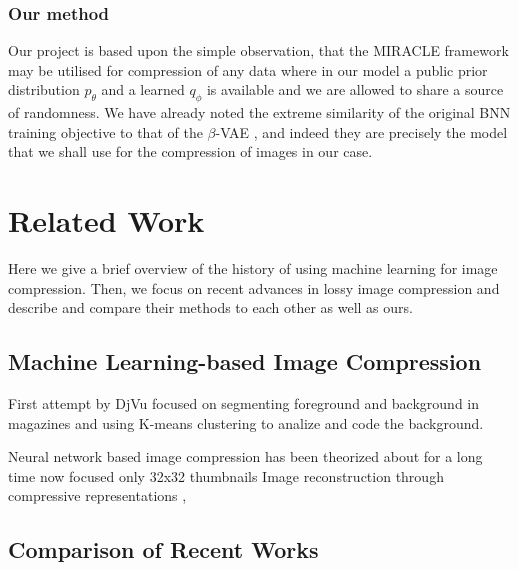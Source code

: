 \documentclass{article}
\begin{document}
\subsubsection{Our method}
Our project is based upon the simple observation, that
the MIRACLE framework may be utilised for compression of any data where in our
model a public prior distribution $p_{\theta}$ and a learned $q_{\phi}$ is
available and we are allowed to share a source of randomness. We have already
noted the extreme similarity of the original BNN training objective to that of
the $\beta$-VAE \cite{higgins2017beta}, and indeed they are precisely the model
that we shall use for the compression of images in our case. 
%
%

\section{Related Work}
\par
Here we give a brief overview of the history of using machine learning for image
compression. Then, we focus on recent advances in lossy image compression and
describe and compare their methods to each other as well as ours.
\subsection{Machine Learning-based Image Compression}
\par

First attempt by \cite{bottou1998high} DjVu focused on segmenting foreground and
background in magazines and using K-means clustering to analize and code the
background.

Neural network based image compression has been theorized about for a long time
now \cite{mougeot1991image} \cite{jiang1999image} 
\cite{toderici2015variable} focused only 32x32 thumbnails
Image reconstruction through compressive representations \cite{denton2015deep},
\cite{gregor2015draw}

\subsection{Comparison of Recent Works}
\label{sec:lit_comparison}
\par
\end{document}
